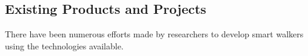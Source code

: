 \subsection{Existing Products and Projects}
\noindent There have been numerous efforts made by researchers to develop smart walkers using the technologies available.